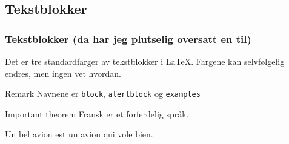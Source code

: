 %  
%
%

\begin{frame}
\subsection*{Tekstblokker}
    \frametitle{Tekstblokker (da har jeg plutselig oversatt en til)}
    
    Det er tre standardfarger av tekstblokker i \LaTeX. Fargene kan selvfølgelig endres, men ingen vet hvordan.
    
    \begin{block}{Remark}
    Navnene er \texttt{block}, \texttt{alertblock} og \texttt{examples}
    \end{block}
   
    \begin{alertblock}{Important theorem}
    Fransk er et forferdelig språk.
    \end{alertblock}
    
    \begin{examples}
    Un bel avion est un avion qui vole bien.
    \end{examples}
\end{frame}

